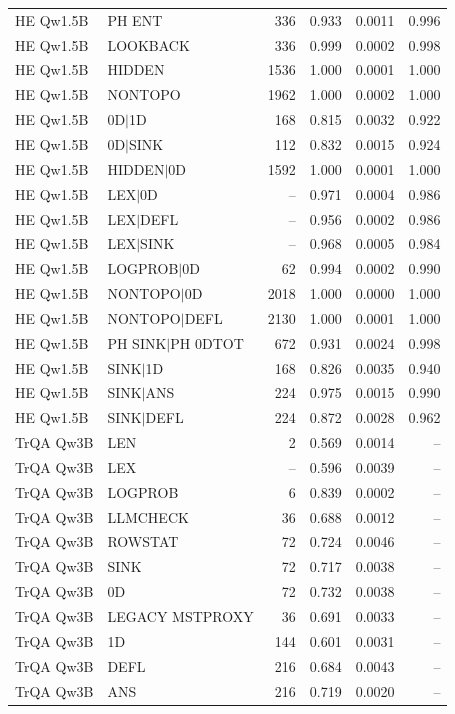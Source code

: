\begin{longtable}{llrrrr}
HE Qw1.5B & PH ENT & 336 & 0.933 & 0.0011 & 0.996 \\
HE Qw1.5B & LOOKBACK & 336 & 0.999 & 0.0002 & 0.998 \\
HE Qw1.5B & HIDDEN & 1536 & 1.000 & 0.0001 & 1.000 \\
HE Qw1.5B & NONTOPO & 1962 & 1.000 & 0.0002 & 1.000 \\
HE Qw1.5B & 0D$\mid$1D & 168 & 0.815 & 0.0032 & 0.922 \\
HE Qw1.5B & 0D$\mid$SINK & 112 & 0.832 & 0.0015 & 0.924 \\
HE Qw1.5B & HIDDEN$\mid$0D & 1592 & 1.000 & 0.0001 & 1.000 \\
HE Qw1.5B & LEX$\mid$0D & -- & 0.971 & 0.0004 & 0.986 \\
HE Qw1.5B & LEX$\mid$DEFL & -- & 0.956 & 0.0002 & 0.986 \\
HE Qw1.5B & LEX$\mid$SINK & -- & 0.968 & 0.0005 & 0.984 \\
HE Qw1.5B & LOGPROB$\mid$0D & 62 & 0.994 & 0.0002 & 0.990 \\
HE Qw1.5B & NONTOPO$\mid$0D & 2018 & 1.000 & 0.0000 & 1.000 \\
HE Qw1.5B & NONTOPO$\mid$DEFL & 2130 & 1.000 & 0.0001 & 1.000 \\
HE Qw1.5B & PH SINK$\mid$PH 0DTOT & 672 & 0.931 & 0.0024 & 0.998 \\
HE Qw1.5B & SINK$\mid$1D & 168 & 0.826 & 0.0035 & 0.940 \\
HE Qw1.5B & SINK$\mid$ANS & 224 & 0.975 & 0.0015 & 0.990 \\
HE Qw1.5B & SINK$\mid$DEFL & 224 & 0.872 & 0.0028 & 0.962 \\
TrQA Qw3B & LEN & 2 & 0.569 & 0.0014 & -- \\
TrQA Qw3B & LEX & -- & 0.596 & 0.0039 & -- \\
TrQA Qw3B & LOGPROB & 6 & 0.839 & 0.0002 & -- \\
TrQA Qw3B & LLMCHECK & 36 & 0.688 & 0.0012 & -- \\
TrQA Qw3B & ROWSTAT & 72 & 0.724 & 0.0046 & -- \\
TrQA Qw3B & SINK & 72 & 0.717 & 0.0038 & -- \\
TrQA Qw3B & 0D & 72 & 0.732 & 0.0038 & -- \\
TrQA Qw3B & LEGACY MSTPROXY & 36 & 0.691 & 0.0033 & -- \\
TrQA Qw3B & 1D & 144 & 0.601 & 0.0031 & -- \\
TrQA Qw3B & DEFL & 216 & 0.684 & 0.0043 & -- \\
TrQA Qw3B & ANS & 216 & 0.719 & 0.0020 & -- \\

\end{longtable}
